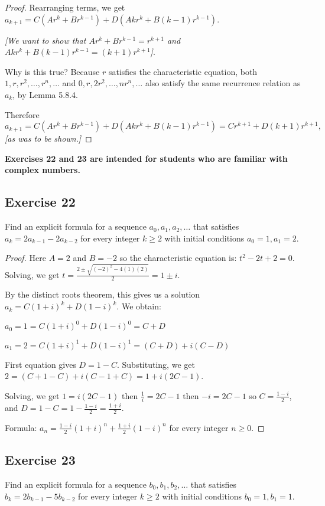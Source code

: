 \documentclass[14pt]{extarticle}
\newcommand{\dps}{\displaystyle}
\newcommand{\cy}{\color{cyan}}
\begin{document}
\begin{proof}
        Rearranging terms, we get \(a_{k+1} = C(Ar^k + Br^{k-1}) + D(Akr^k + B(k-1)r^{k-1})\).

            {\it [We want to show that \(Ar^k + Br^{k-1} = r^{k+1}\) and \(Akr^k + B(k-1)r^{k-1} = (k+1)r^{k+1}\)]}.

        Why is this true? Because $r$ satisfies the characteristic equation, both \(1, r, r^2, \ldots, r^n, \ldots\) and \(0, r, 2r^2, \ldots, nr^n, \ldots\) also satisfy the same recurrence relation as $a_k$, by Lemma 5.8.4.

    Therefore
    \[
        a_{k+1} = C(Ar^k + Br^{k-1}) + D(Akr^k + B(k-1)r^{k-1}) = Cr^{k+1} + D(k+1)r^{k+1},
    \]
    {\it [as was to be shown.]}
\end{proof}

{\bf \cy Exercises 22 and 23 are intended for students who are familiar with complex numbers.}

\subsection{Exercise 22}
Find an explicit formula for a sequence \(a_0, a_1, a_2, \ldots\) that satisfies \(a_k = 2a_{k-1} - 2a_{k-2}\)
for every integer \(k \geq 2\) with initial conditions \(a_0 = 1, a_1 = 2\).

\begin{proof}
    Here $A = 2$ and $B = -2$ so the characteristic equation is: \(t^2 - 2t + 2 = 0\).
    Solving, we get \(\dps t = \frac{2 \pm \sqrt{(-2)^2 - 4(1)(2)}}{2} = 1 \pm i\).

    By the distinct roots theorem, this gives us a solution \(a_k = C(1+i)^k + D(1-i)^k\). We obtain:

    \(a_0 = 1 = C(1+i)^0 + D(1-i)^0 = C + D\)

    \(a_1 = 2 = C(1+i)^1 + D(1-i)^1 = (C + D) + i(C - D)\)

    First equation gives $D = 1 - C$. Substituting, we get \(2 = (C+1-C) + i(C - 1 + C) = 1 + i(2C-1)\).

    Solving, we get \(1 = i(2C-1)\) then \(\frac{1}{i} = 2C-1\) then \(-i = 2C-1\) so \(C = \frac{1-i}{2}\),
    and \(\dps D = 1 - C = 1 - \frac{1-i}{2} = \frac{1+i}{2}\).

    Formula: \(\dps a_n = \frac{1-i}{2}(1+i)^n + \frac{1+i}{2}(1-i)^n\) for every integer \(n \geq 0\).
\end{proof}

\subsection{Exercise 23}
Find an explicit formula for a sequence \(b_0, b_1, b_2, \ldots\) that satisfies \(b_k = 2b_{k-1} - 5b_{k-2}\)
for every integer \(k \geq 2\) with initial conditions \(b_0 = 1, b_1 = 1\).
\end{document}
